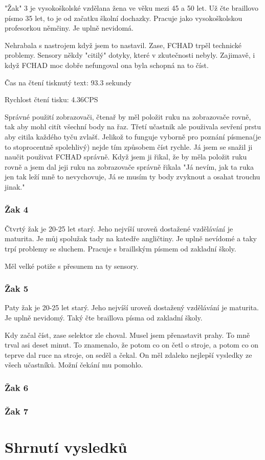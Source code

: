 "Žak" 3 je vysokoškolské vzdělana žena ve věku mezi 45 a 50 let. Už čte braillovo písmo 35 let, to je od začatku školní dochazky.  Pracuje jako vysokoškolskou profesorkou němčiny.  Je uplně nevidomá.

Nehrabala s nastrojem když jsem to nastavil. Zase, FCHAD trpěl technické problemy. Sensory někdy "citilý" dotyky, které v zkutečnosti nebyly.  Zajimavě, i když FCHAD moc dobře nefungoval ona byla schopná na to číst.

Čas na čtení tisknutý text: 93.3 sekundy

Rychlost čtení tisku: 4.36CPS

Správné použití zobrazovači, čtenař by měl položit ruku na zobrazovače rovně, tak aby mohl citít všechní body na řaz.  Třetí učastnik ale použivala sevření prstu aby citila každého tyču zvlašť.  Jelikož to funguje vyborně pro poznání písmena(je to stoprocentně spolehlivý) nejde tím způsobem číst rychle. Já jsem se snažil ji naučit použivat FCHAD správně.  Když jsem ji řikal, že by měla položit ruku rovně a jsem dal jeji ruku na zobrazovače správně řikala "Já nevím, jak ta ruka jen tak leží mně to nevychovuje, Já se musím ty body zvyknout a osahat trouchu jinak." %


\subsubsection{Žak 4}

Čtvrtý žak je 20-25 let starý.  Jeho nejvíší uroveň dostažené vzdělávání je maturita.  Je můj spolužak tady na katedře angličtiny. Je uplně nevídomé a taky trpí problemy se sluchem.  Pracuje s braillským písmem od zakladní školy.

Měl velké potiže s přesunem na ty sensory.

\subsubsection{Žak 5}

Paty žak je 20-25 let starý.  Jeho nejvíší uroveň dostažený vzdělávání je maturita. Je uplně nevidomý.  Taký čte braillova písma od zakladní školy.

Kdy začal číst, zase selektor zle choval.  Musel jsem přenastavit prahy.  To mně trval asi deset minut.  To znamenalo, že potom co on četl o stroje, a potom co on teprve dal ruce na stroje, on seděl a čekal.  On měl zdaleko nejlepší vysledky ze všech učastníků.  Možní čekání mu pomohlo.

\subsubsection{Žak 6}

\subsubsection{Žak 7}

\section{Shrnutí vysledků}
